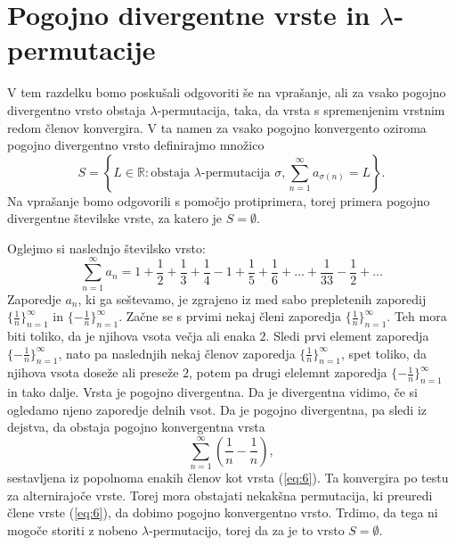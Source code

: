 \documentclass[12pt,a4paper,reqno]{amsart}
\theoremstyle{definition} %
\theoremstyle{plain} %
\begin{document}
\section{Pogojno divergentne vrste in $\lambda$-permutacije}

V tem razdelku bomo poskušali odgovoriti še na vprašanje, ali za vsako pogojno divergentno vrsto obstaja $\lambda$-permutacija, taka, da vrsta s spremenjenim vrstnim redom členov konvergira. V ta namen za vsako pogojno konvergento oziroma pogojno divergentno vrsto definirajmo množico $$S=\left \{L\in \mathbb{R}:\textrm{obstaja }\lambda \textrm{-permutacija } \sigma, \sum^{\infty}_{n=1}a_{\sigma (n)}=L\right \}.$$ Na vprašanje bomo odgovorili s pomočjo protiprimera, torej primera pogojno divergentne številske vrste, za katero je $S=\emptyset$. %

Oglejmo si naslednjo številsko vrsto:
\begin{equation}\label{eq:6}
\sum^{\infty}_{n=1}a_n = 1+\frac{1}{2}+\frac{1}{3}+\frac{1}{4}-1+\frac{1}{5}+\frac{1}{6}+ \dots +\frac{1}{33}-\frac{1}{2}+\dots
\end{equation}
Zaporedje $a_n$, ki ga seštevamo, je zgrajeno iz med sabo prepletenih zaporedij $\{\frac{1}{n}\}_{n=1}^{\infty}$ in $\{-\frac{1}{n}\}_{n=1}^{\infty}$. Začne se s prvimi nekaj členi zaporedja $\{\frac{1}{n}\}_{n=1}^{\infty}$. Teh mora biti toliko, da je njihova vsota večja ali enaka $2$. Sledi prvi element zaporedja $\{-\frac{1}{n}\}_{n=1}^{\infty}$, nato pa naslednjih nekaj členov zaporedja $\{\frac{1}{n}\}_{n=1}^{\infty}$, spet toliko, da njihova vsota doseže ali preseže $2$, potem pa drugi elelemnt zaporedja $\{-\frac{1}{n}\}_{n=1}^{\infty}$ in tako dalje. 
Vrsta je pogojno divergentna. Da je divergentna vidimo, če si ogledamo njeno zaporedje delnih vsot. %
Da je pogojno divergentna, pa sledi iz dejstva, da obstaja pogojno konvergentna vrsta $$\sum_{n=1}^{\infty}\left(\frac{1}{n}-\frac{1}{n}\right),$$ %
sestavljena iz popolnoma enakih členov kot vrsta (\ref{eq:6}). Ta konvergira po testu za alternirajoče vrste. %
Torej mora obstajati nekakšna permutacija, ki preuredi člene vrste (\ref{eq:6}), da dobimo pogojno konvergentno vrsto.
Trdimo, da tega ni mogoče storiti z nobeno $\lambda$-permutacijo, torej da za je to vrsto $S=\emptyset$. 
\end{document}
